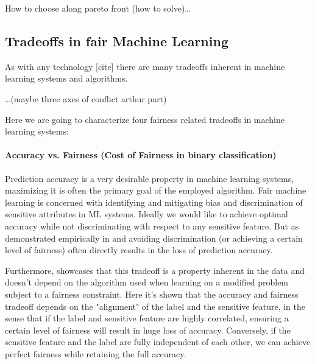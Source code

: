 	How to choose along pareto front (how to solve)\dots



	\clearpage
	\subsection{Tradeoffs in fair Machine Learning}
	As with any technology [cite] there are many tradeoffs inherent in machine learning systems and algorithms.

	\dots (maybe three axes of conflict arthur part)

	Here we are going to characterize four fairness related tradeoffs in machine learning systems:
	
	\paragraph{Accuracy vs. Fairness (Cost of Fairness in binary classification)}
	Prediction accuracy is a very desirable property in machine learning systems, maximizing it is often the primary goal of the employed algorithm.
	Fair machine learning is concerned with identifying and mitigating bias and discrimination of sensitive attributes in ML systems.
	Ideally we would like to achieve optimal accuracy while not discriminating with respect to any sensitive feature.
	But as demonstrated empirically in \eg \cite{kamiran2010discrimination} and \cite{zliobaite2015relation} avoiding discrimination (or achieving a certain level of fairness) often directly results in the loss of prediction accuracy.

	Furthermore, \cite{menon2018cost} showcases that this tradeoff is a property inherent in the data and doesn't depend on the algorithm used when learning on a modified problem subject to a fairness constraint.
	Here it's shown that the accuracy and fairness tradeoff depends on the "alignment" of the label and the sensitive feature, in the sense that if the label and sensitive feature are highly correlated, ensuring a certain level of fairness will result in huge loss of accuracy.
	Conversely, if the sensitive feature and the label are fully independent of each other, we can achieve perfect fairness while retaining the full accuracy.

